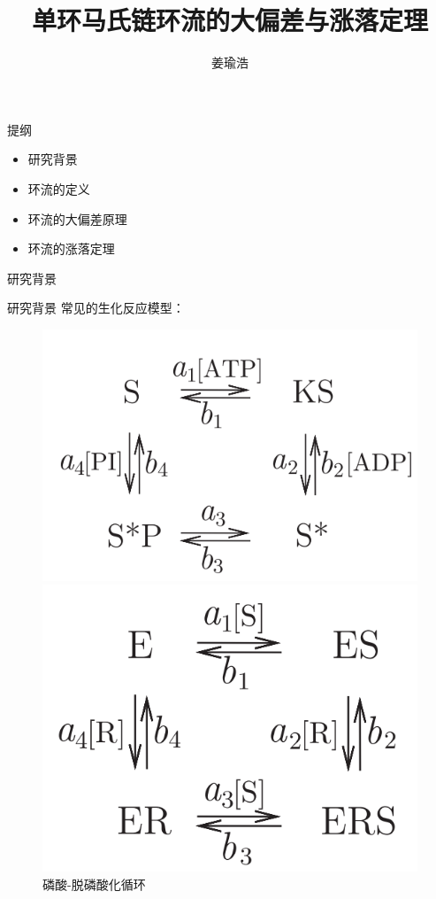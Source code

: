 \documentclass{beamer}
\title[单环马氏链环流的大偏差与涨落定理]{单环马氏链环流的大偏差与涨落定理}
\author{姜瑜浩}
\institute[CSRC]
{\normalsize 指导老师：贾晨 ~特聘研究员\\
北京计算科学研究中心
}
\begin{document}
\frame{\titlepage}

\begin{frame}{提纲}
	\begin{itemize}
		\item 研究背景
  		\item 环流的定义 
    	\item 环流的大偏差原理
     	\item 环流的涨落定理
	\end{itemize}
\end{frame}

\begin{frame}
	\begin{center}
		\Huge 研究背景
	\end{center}
\end{frame}


\begin{frame}{研究背景}
	常见的生化反应模型：
	\begin{figure}[h]
		\begin{minipage}[t]{0.4\linewidth}
			\centering
			\includegraphics[scale=0.4]{chart/phosphorylation_dephosphorylation_cycle.png}
			\caption{磷酸-脱磷酸化循环}
		\end{minipage}
		\begin{minipage}[t]{0.4\linewidth}
			\centering
			\includegraphics[scale=0.4]{chart/general_modifier_machanism.png}

\end{minipage}
\end{figure}
\end{frame}
\end{document}
